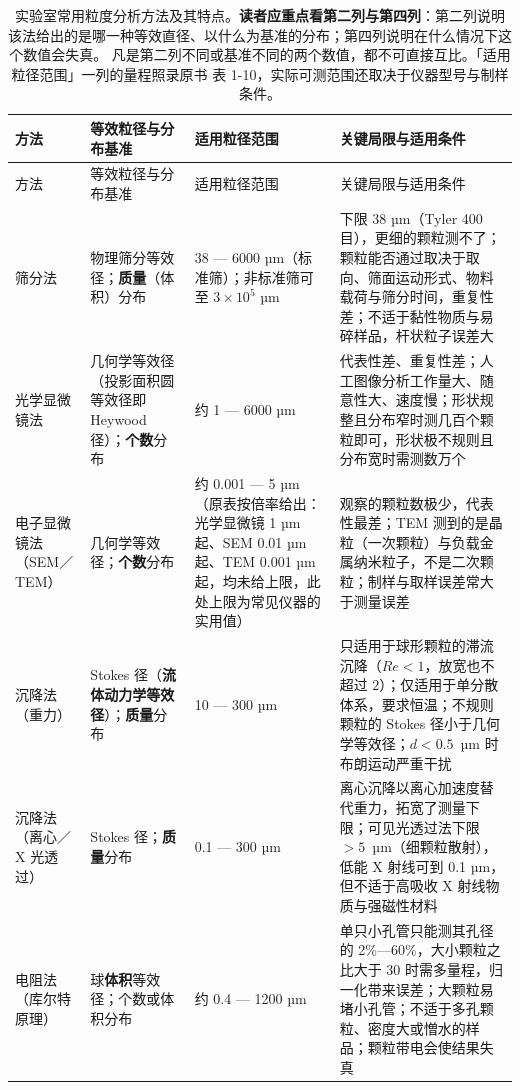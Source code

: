 {\srcsize
\setlength{\tabcolsep}{3pt}
\begin{longtable}{@{}p{26mm}p{44mm}p{26mm}p{62mm}@{}}
\caption{实验室常用粒度分析方法及其特点。\textbf{读者应重点看第二列与第四列}：第二列说明
该法给出的是哪一种等效直径、以什么为基准的分布；第四列说明在什么情况下这个数值会失真。
凡是第二列不同或基准不同的两个数值，都不可直接互比。「适用粒径范围」一列的量程照录原书
表 1-10，实际可测范围还取决于仪器型号与制样条件。}
\label{tab:ch01c-methods}\\
\toprule
方法 & 等效粒径与分布基准 & 适用粒径范围 & 关键局限与适用条件 \\
\midrule
\endfirsthead
\toprule
方法 & 等效粒径与分布基准 & 适用粒径范围 & 关键局限与适用条件 \\
\midrule
\endhead
\bottomrule
\endlastfoot
筛分法 & 物理筛分等效径；\textbf{质量}（体积）分布 & 38 — 6000 µm（标准筛）；非标准筛可至 $3\times10^{5}$ µm & 下限 38 µm（Tyler 400 目），更细的颗粒测不了；颗粒能否通过取决于取向、筛面运动形式、物料载荷与筛分时间，重复性差；不适于黏性物质与易碎样品，杆状粒子误差大 \\
光学显微镜法 & 几何学等效径（投影面积圆等效径即 Heywood 径）；\textbf{个数}分布 & 约 1 — 6000 µm & 代表性差、重复性差；人工图像分析工作量大、随意性大、速度慢；形状规整且分布窄时测几百个颗粒即可，形状极不规则且分布宽时需测数万个 \\
电子显微镜法（SEM／TEM） & 几何学等效径；\textbf{个数}分布 & 约 0.001 — 5 µm（原表按倍率给出：光学显微镜 1 µm 起、SEM 0.01 µm 起、TEM 0.001 µm 起，均未给上限，此处上限为常见仪器的实用值） & 观察的颗粒数极少，代表性最差；TEM 测到的是晶粒（一次颗粒）与负载金属纳米粒子，不是二次颗粒；制样与取样误差常大于测量误差 \\
沉降法（重力） & Stokes 径（\textbf{流体动力学等效径}）；\textbf{质量}分布 & 10 — 300 µm & 只适用于球形颗粒的滞流沉降（$Re<1$，放宽也不超过 $2$）；仅适用于单分散体系，要求恒温；不规则颗粒的 Stokes 径小于几何学等效径；$d<0.5$~µm 时布朗运动严重干扰 \\
沉降法（离心／X 光透过） & Stokes 径；\textbf{质量}分布 & 0.1 — 300 µm & 离心沉降以离心加速度替代重力，拓宽了测量下限；可见光透过法下限 $>5$~µm（细颗粒散射），低能 X 射线可到 0.1 µm，但不适于高吸收 X 射线物质与强磁性材料 \\
电阻法（库尔特原理） & 球\textbf{体积}等效径；个数或体积分布 & 约 0.4 — 1200 µm & 单只小孔管只能测其孔径的 2\%—60\%，大小颗粒之比大于 30 时需多量程，归一化带来误差；大颗粒易堵小孔管；不适于多孔颗粒、密度大或憎水的样品；颗粒带电会使结果失真 \\

\end{longtable}}
